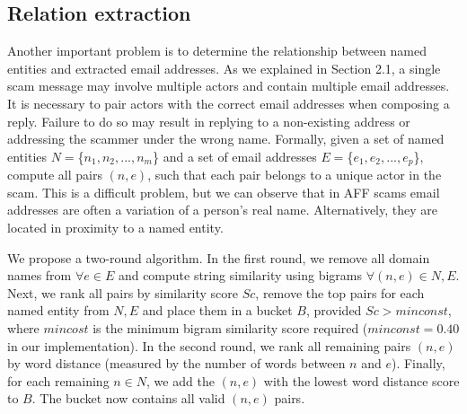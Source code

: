 \subsection{Relation extraction}
Another important problem is to determine the relationship between named entities and extracted email addresses. As we explained in Section 2.1, a single scam message may involve multiple actors and contain multiple email addresses. It is necessary to pair actors with the correct email addresses when composing a reply. Failure to do so may result in replying to a non-existing address or addressing the scammer under the wrong name. Formally, given a set of named entities $N = $\{$n_{1}, n_{2},...,n_{m}$\} and a set of email addresses $E = $\{$e_{1}, e_{2},...,e_{p}$\}, compute all pairs $(n, e)$, such that each pair belongs to a unique actor in the scam. This is a difficult problem, but we can observe that in AFF scams email addresses are often a variation of a person's real name. Alternatively, they are located in proximity to a named entity.

We propose a two-round algorithm. In the first round, we remove all domain names from $\forall e \in E$ and compute string similarity using bigrams $\forall (n, e) \in N, E$. Next, we rank all pairs by similarity score $Sc$, remove the top pairs for each named entity from $N, E$ and place them in a bucket $B$, provided $Sc > minconst$, where $mincost$ is the minimum bigram similarity score required ($minconst = 0.40$ in our implementation). In the second round, we rank all remaining pairs $(n, e)$ by word distance (measured by the number of words between $n$ and $e$). Finally, for each remaining $n \in N$, we add the $(n, e)$ with the lowest word distance score to $B$. The bucket now contains all valid $(n, e)$ pairs.
